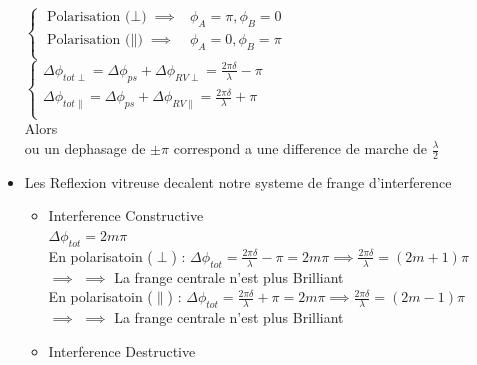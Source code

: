\documentclass[12pt]{book}
\begin{document}
\begin{itemize}
\begin{center}
\begin{minipage}{0.69\linewidth}
                            $\begin{cases}
                                \text{Polarisation ($\perp$)} \implies & \phi_A=\pi , \phi_B = 0 \\
                                \text{Polarisation ($\parallel$)} \implies & \phi_A=0 , \phi_B = \pi \\
                            \end{cases}$\\
                            $\begin{cases}
                                \Delta\phi_{tot\perp}=\Delta\phi_{ps} + \Delta\phi_{RV\perp} =\frac{2\pi\delta}{\lambda}-\pi \\
                                \Delta\phi_{tot\parallel}=\Delta\phi_{ps} + \Delta\phi_{RV\parallel} =\frac{2\pi\delta}{\lambda}+\pi \\
                            \end{cases}$ \\
                            Alors  \\
                            ou un dephasage de $\pm\pi$ correspond a une difference de marche de $\frac{\lambda}{2}$  
                        \end{minipage}
                    \end{center}
                \item Les Reflexion vitreuse decalent notre systeme de frange d'interference
                    \begin{itemize}
                        \item Interference Constructive\\
                            $\Delta\phi_{tot}= 2m\pi$\\
                            En polarisatoin ($ \perp $) :   $\Delta\phi_{tot}=\frac{2\pi\delta}{\lambda}-\pi=2m\pi\implies\frac{2\pi\delta}{\lambda}=(2m+1)\pi$\\
                            $\implies$ $\implies$ La frange centrale n'est plus Brilliant\\
                            En polarisatoin ($ \parallel $) :   $\Delta\phi_{tot}=\frac{2\pi\delta}{\lambda}+\pi=2m\pi\implies\frac{2\pi\delta}{\lambda}=(2m-1)\pi$\\
                            $\implies$ $\implies$ La frange centrale n'est plus Brilliant
                        \item Interference Destructive 

\end{itemize}
\end{itemize}
\end{document}
